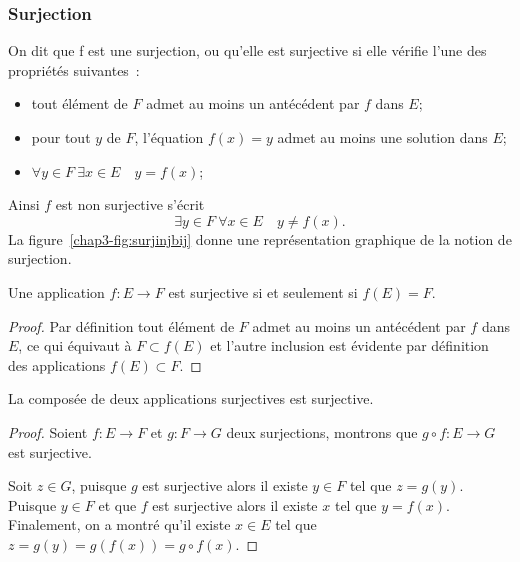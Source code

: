 \subsubsection{Surjection}
\label{chap3-subsubsec:surjection}
\begin{defdef}
  On dit que f est une surjection, ou qu'elle est surjective si elle vérifie l'une des propriétés suivantes~:
  \begin{itemize}
  \item tout élément de \(F\) admet au moins un antécédent par \(f\) dans \(E\);
  \item pour tout \(y\) de \(F\), l'équation \(f(x)=y\) admet au moins une solution dans \(E\);
  \item \(\forall y \in F \ \exists x \in E \quad y=f(x)\);
  \end{itemize}
  Ainsi \(f\) est non surjective s'écrit
  \begin{equation}
    \exists y \in F \ \forall x \in E \quad y \neq f(x).
  \end{equation}
  La figure~\ref{chap3-fig:surjinjbij} donne une représentation graphique de la notion de surjection.
\end{defdef}
\begin{prop}
  Une application \(f:E \longrightarrow F\) est surjective si et seulement si \(f(E)=F\).
\end{prop}
\begin{proof}
    Par définition tout élément de \(F\) admet au moins un antécédent par \(f\) dans \(E\), ce qui équivaut à \(F \subset f(E)\) et l'autre inclusion est évidente par définition des applications \(f(E) \subset F\).
\end{proof}
\begin{theo}
  La composée de deux applications surjectives est surjective.
\end{theo}
\begin{proof}
  Soient \(f:E \longrightarrow F\) et \(g:F \longrightarrow G\) deux surjections, montrons que \(g \circ f: E \longrightarrow G\) est surjective. 

  Soit \(z \in G\), puisque \(g\) est surjective alors il existe \(y \in F\) tel que \(z=g(y)\). Puisque \(y \in F\) et que \(f\) est surjective alors il existe \(x\) tel que \(y=f(x)\). Finalement, on a montré qu'il existe \(x \in E\) tel que \(z=g(y)=g(f(x))= g \circ f(x)\).
\end{proof}
%
